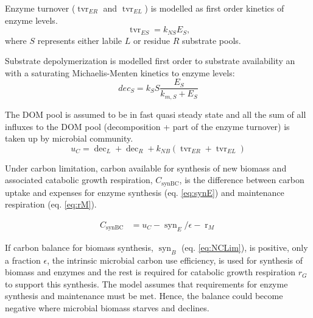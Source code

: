 Enzyme turnover ($\operatorname{tvr}_{ER}$ and $\operatorname{tvr}_{EL}$) is
modelled as first order kinetics of enzyme levels.
\begin{equation}
\label{eq:tvrE}
\operatorname{tvr}_{ES} = k_{NS} E_S \text{,}
\end{equation}
where $S$ represents either labile $L$ or residue $R$ substrate pools.  

% 
Substrate depolymerization is modelled first order to substrate
availability an with a saturating Michaelis-Menten kinetics to enzyme levels:
\begin{equation}
\label{eq:dec}
dec_S = k_S S \frac{E_S}{k_{m,S} + E_S} 
\end{equation}
 
The DOM pool is assumed to be in fast quasi steady state and all the sum of all
influxes to the DOM pool (decomposition + part of the enzyme turnover) is taken
up by microbial community.
\begin{equation}
\label{eq:uC}
u_C = \operatorname{dec}_L + \operatorname{dec}_R +  k_{NB}
(\operatorname{tvr}_{ER} + \operatorname{tvr}_{EL})
\end{equation}

Under carbon limitation, carbon available for synthesis of new biomass and
associated catabolic growth respiration, $C_{\operatorname{synBC}}$, is the
difference between carbon uptake and expenses for enzyme synthesis (eq.
\ref{eq:synE}) and maintenance respiration (eq.
\ref{eq:rM}).

\begin{subequations}
\label{eq:synB}
\begin{align}
\label{eq:synBC} C_{\operatorname{synBC}} &= u_C -
\operatorname{syn}_E/\epsilon - \operatorname{r}_{M} 
\end{align}
\end{subequations}

If carbon balance for biomass synthesis, $\operatorname{syn}_B$ (eq.
\ref{eq:NCLim}), is positive, only a fraction $\epsilon$, the intrinsic
microbial carbon use efficiency, is used for synthesis of biomass and enzymes
and the rest is required for catabolic growth respiration $r_G$ to support this
synthesis.
The model assumes that requirements for enzyme synthesis and maintenance must be
met. Hence, the balance could become negative where microbial biomass starves
and declines.

